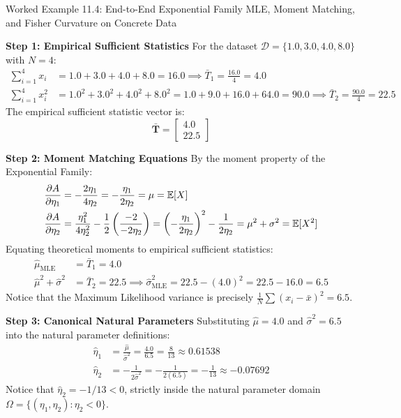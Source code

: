 \begin{examplebox}[breakable]{Worked Example 11.4: End-to-End Exponential Family MLE, Moment Matching, and Fisher Curvature on Concrete Data}
\tcblower

\textbf{Step 1: Empirical Sufficient Statistics}
For the dataset $\mathcal{D} = \{1.0, 3.0, 4.0, 8.0\}$ with $N = 4$:
\begin{align}
\sum_{i=1}^4 x_i &= 1.0 + 3.0 + 4.0 + 8.0 = 16.0 \implies \bar{T}_1 = \frac{16.0}{4} = 4.0 \\
\sum_{i=1}^4 x_i^2 &= 1.0^2 + 3.0^2 + 4.0^2 + 8.0^2 = 1.0 + 9.0 + 16.0 + 64.0 = 90.0 \implies \bar{T}_2 = \frac{90.0}{4} = 22.5
\end{align}
The empirical sufficient statistic vector is:
\begin{equation}
\bar{\mathbf{T}} = \begin{bmatrix} 4.0 \\ 22.5 \end{bmatrix}
\end{equation}

\textbf{Step 2: Moment Matching Equations}
By the moment property of the Exponential Family:
\begin{align}
\frac{\partial A}{\partial \eta_1} &= -\frac{2\eta_1}{4\eta_2} = -\frac{\eta_1}{2\eta_2} = \mu = \operatorname{\mathbb{E}}[X] \\
\frac{\partial A}{\partial \eta_2} &= \frac{\eta_1^2}{4\eta_2^2} - \frac{1}{2}\left(\frac{-2}{-2\eta_2}\right) = \left(-\frac{\eta_1}{2\eta_2}\right)^2 - \frac{1}{2\eta_2} = \mu^2 + \sigma^2 = \operatorname{\mathbb{E}}[X^2]
\end{align}
Equating theoretical moments to empirical sufficient statistics:
\begin{align}
\hat{\mu}_{\text{MLE}} &= \bar{T}_1 = 4.0 \\
\hat{\mu}^2 + \hat{\sigma}^2 &= \bar{T}_2 = 22.5 \implies \hat{\sigma}^2_{\text{MLE}} = 22.5 - (4.0)^2 = 22.5 - 16.0 = 6.5
\end{align}
Notice that the Maximum Likelihood variance is precisely $\frac{1}{N}\sum (x_i - \bar{x})^2 = 6.5$.

\textbf{Step 3: Canonical Natural Parameters}
Substituting $\hat{\mu} = 4.0$ and $\hat{\sigma}^2 = 6.5$ into the natural parameter definitions:
\begin{align}
\hat{\eta}_1 &= \frac{\hat{\mu}}{\hat{\sigma}^2} = \frac{4.0}{6.5} = \frac{8}{13} \approx 0.61538 \\
\hat{\eta}_2 &= -\frac{1}{2\hat{\sigma}^2} = -\frac{1}{2(6.5)} = -\frac{1}{13} \approx -0.07692
\end{align}
Notice that $\hat{\eta}_2 = -1/13 < 0$, strictly inside the natural parameter domain $\Omega = \{ (\eta_1, \eta_2) : \eta_2 < 0 \}$.


\end{examplebox}
